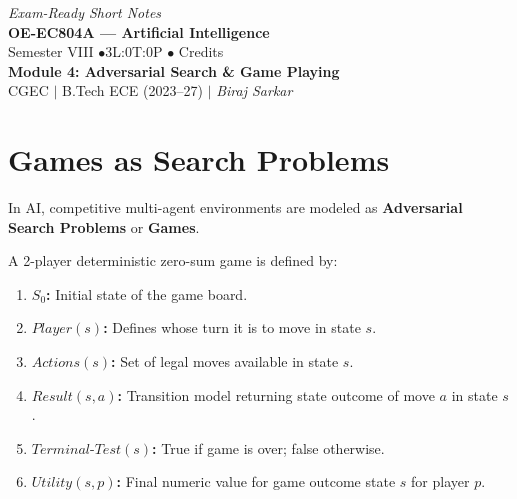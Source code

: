 \documentclass[12pt,a4paper]{article}
\begin{document}
\begin{center}
  \hfill \textit{Exam-Ready Short Notes} \\
  \vspace{6pt}
  {\LARGE\bfseries\color{myred} OE-EC804A --- Artificial Intelligence}\\[5pt]
  {\normalsize\color{mydark} Semester VIII \quad$\bullet$\quad 3L:0T:0P \quad$\bullet$ Credits}\\[3pt]
  {\normalsize\color{myteal}\textbf{Module 4: Adversarial Search \& Game Playing}}\\[3pt]
  {\small\color{mydark} CGEC \;$|$\; B.Tech ECE (2023--27) \;$|$\; \textit{Biraj Sarkar}}
\end{center}
\vspace{2pt}
\noindent{\color{myred}\rule{\linewidth}{1.5pt}}
\vspace{2pt}

\hypersetup{linkcolor=mydark}
\tableofcontents
\hypersetup{linkcolor=myteal}
\newpage

\section{Games as Search Problems}

In AI, competitive multi-agent environments are modeled as \textbf{Adversarial Search Problems} or \textbf{Games}.

\begin{tcolorbox}[defbox, title={Formal Definition of a Game}]
  A 2-player deterministic zero-sum game is defined by:
  \begin{enumerate}[leftmargin=*, noitemsep]
    \item \textbf{$S_0$:} Initial state of the game board.
    \item \textbf{$Player(s)$:} Defines whose turn it is to move in state $s$.
    \item \textbf{$Actions(s)$:} Set of legal moves available in state $s$.
    \item \textbf{$Result(s, a)$:} Transition model returning state outcome of move $a$ in state $s$.
    \item \textbf{$Terminal\text{-}Test(s)$:} True if game is over; false otherwise.
    \item \textbf{$Utility(s, p)$:} Final numeric value for game outcome state $s$ for player $p$.
  \end{enumerate}
\end{tcolorbox}
\end{document}
